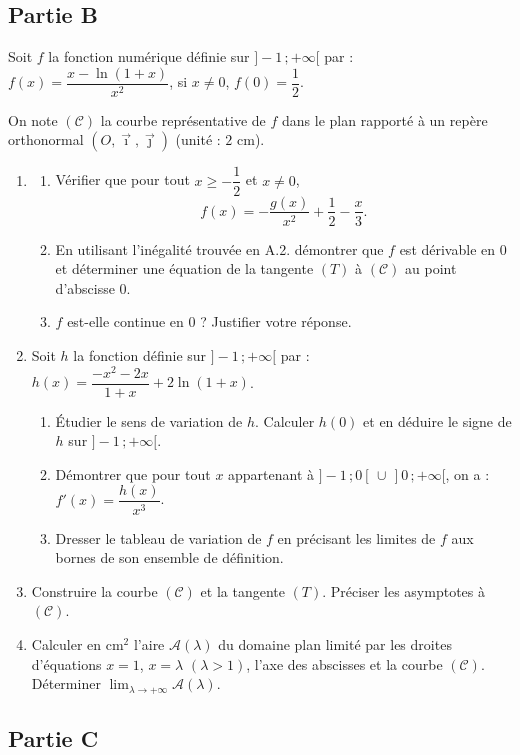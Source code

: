 \subsection*{Partie B}

Soit $f$ la fonction numérique définie sur $]-1\,;+\infty[$ par : $f(x)=\dfrac{x-\ln(1+x)}{x^2}$, si $x\neq0$, $f(0)=\dfrac12$.

On note $(\mathscr{C})$ la courbe représentative de $f$ dans le plan rapporté à un repère orthonormal $(O,\vec{\imath},\vec{\jmath})$ (unité : $2$ cm).

\begin{enumerate}
	\item
	\begin{enumerate}
		\item Vérifier que pour tout $x \geqslant -\dfrac12$ et $x\neq0$,
		\[
		f(x) = -\frac{g(x)}{x^2} + \frac12 - \frac{x}{3}.
		\]
		\item En utilisant l'inégalité trouvée en A.2. démontrer que $f$ est dérivable en $0$ et déterminer une équation de la tangente $(T)$ à $(\mathscr{C})$ au point d'abscisse $0$.
		\item $f$ est-elle continue en $0$ ? Justifier votre réponse.
	\end{enumerate}
	\item Soit $h$ la fonction définie sur $]-1\,;+\infty[$ par : $h(x) = \dfrac{-x^2-2x}{1+x} + 2\ln(1+x)$.
	\begin{enumerate}
		\item Étudier le sens de variation de $h$. Calculer $h(0)$ et en déduire le signe de $h$ sur $]-1\,;+\infty[$.
		\item Démontrer que pour tout $x$ appartenant à $]-1\,;0[\,\cup\,]0\,;+\infty[$, on a : $f'(x)=\dfrac{h(x)}{x^3}$.
		\item Dresser le tableau de variation de $f$ en précisant les limites de $f$ aux bornes de son ensemble de définition.
	\end{enumerate}
	\item Construire la courbe $(\mathscr{C})$ et la tangente $(T)$. Préciser les asymptotes à $(\mathscr{C})$.
	\item Calculer en cm$^2$ l'aire $\mathscr{A}(\lambda)$ du domaine plan limité par les droites d'équations $x=1$, $x=\lambda$ $(\lambda>1)$, l'axe des abscisses et la courbe $(\mathscr{C})$. Déterminer $\displaystyle\lim_{\lambda\to+\infty} \mathscr{A}(\lambda)$.
\end{enumerate}

\subsection*{Partie C}


